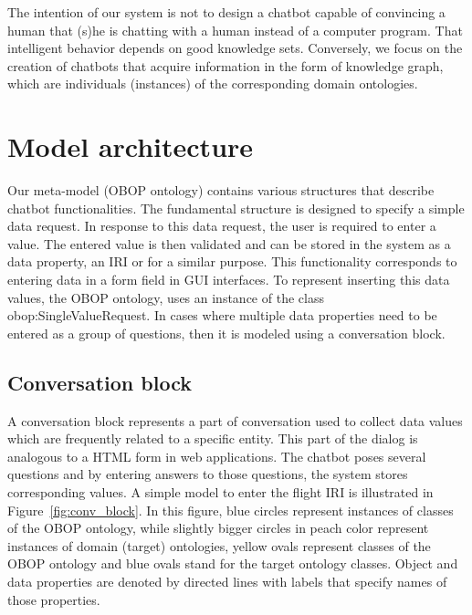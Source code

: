 \documentclass[runningheads]{llncs}
\begin{document}
The intention of our system is not to design a chatbot capable of convincing a human that (s)he is chatting with a human instead of a computer program. That intelligent behavior depends on good knowledge sets. Conversely, we focus on the creation of chatbots that acquire information in the form of knowledge graph, which are individuals (instances) of the corresponding domain ontologies.  



\section{Model architecture}
Our meta-model (OBOP ontology) contains various structures that describe chatbot functionalities. The fundamental structure is designed to specify a simple data request. In response to this data request, the user is required to enter a value. The entered value is then validated and can be stored in the system as a data property, an IRI or for a similar purpose. This functionality corresponds to entering data in a form field in GUI interfaces. To represent inserting this data values, the OBOP ontology, uses an instance of the class obop:SingleValueRequest. In cases where multiple data properties need to be entered as a group of questions, then it is modeled using a conversation block.

\subsection{Conversation block}
A conversation block represents a part of conversation used to collect data values which are frequently related to a specific entity. This part of the dialog is analogous to a HTML form in web applications. The chatbot poses several questions and by entering answers to those questions, the system stores corresponding values. A simple model to enter the flight IRI is illustrated in Figure~\ref{fig:conv_block}. In this figure, blue circles represent instances of classes of the OBOP ontology, while slightly bigger circles in peach color represent instances of domain (target) ontologies, yellow ovals represent classes of the OBOP ontology and blue ovals stand for the target ontology classes. Object and data properties are denoted by directed lines with labels that specify names of those properties.     
\end{document}
